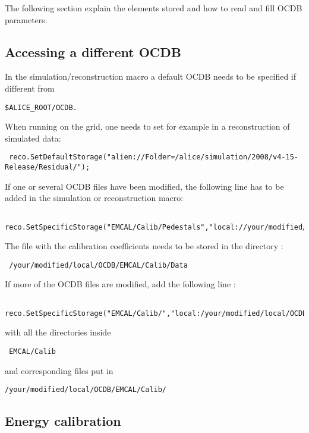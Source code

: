 The following section explain the elements stored and how to read and fill OCDB parameters.

\subsection{Accessing a different OCDB}

In the simulation/reconstruction macro a default OCDB needs to be specified if different from 
\begin{lstlisting} 
$ALICE_ROOT/OCDB.
\end{lstlisting} 
When running on the grid, one needs to set for example in a reconstruction of simulated data:
\begin{lstlisting}
 reco.SetDefaultStorage("alien://Folder=/alice/simulation/2008/v4-15-Release/Residual/");
\end{lstlisting}
If one or several OCDB files have been modified, the following line has to be added in the simulation or reconstruction macro:
\begin{lstlisting}
 reco.SetSpecificStorage("EMCAL/Calib/Pedestals","local://your/modified/local/OCDB");
\end{lstlisting}

The file with the calibration coefficients needs to be stored in the directory :
\begin{lstlisting}
 /your/modified/local/OCDB/EMCAL/Calib/Data 
 \end{lstlisting}
 
If more of the OCDB files are modified, add the following line :
\begin{lstlisting}
 reco.SetSpecificStorage("EMCAL/Calib/","local:/your/modified/local/OCDB");
 \end{lstlisting}
with all the directories inside \begin{lstlisting} EMCAL/Calib \end{lstlisting} and corresponding files put in 
\begin{lstlisting}
/your/modified/local/OCDB/EMCAL/Calib/
\end{lstlisting}

\subsection{Energy calibration}

